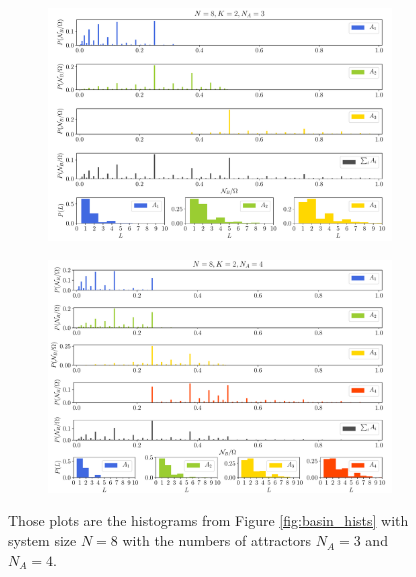 \begin{figure}[h!]
	\begin{subfigure}{\textwidth}
		\includegraphics[width=\textwidth]{Plots/basin_hists_N8_3}
	\end{subfigure}
	\begin{subfigure}{\textwidth}
		\includegraphics[width=\textwidth]{Plots/basin_hists_N8_4}
	\end{subfigure}
	\caption{Those plots are the histograms from Figure \ref{fig:basin_hists} with system size $N=8$ with the numbers of attractors $N_A=3$ and $N_A=4$.}
	\label{fig:basin_hists_additional_attractors}
\end{figure}

\newpage
\paragraph*{}\paragraph*{}
